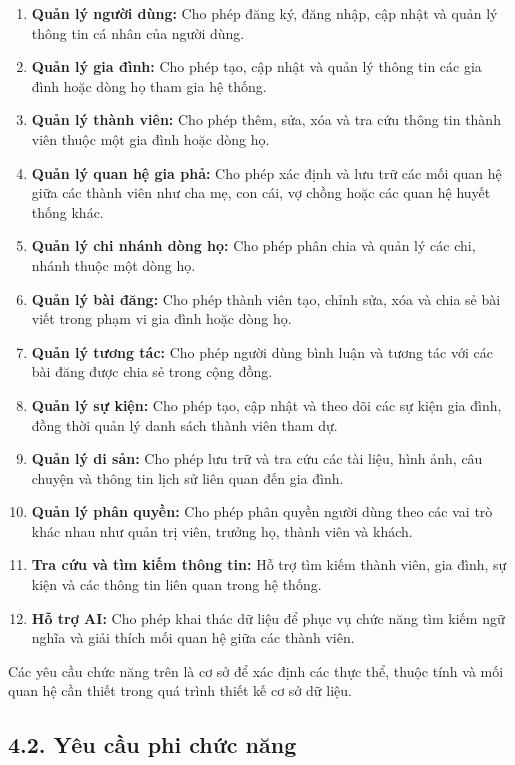 \begin{enumerate}[leftmargin=*]
\item \textbf{Quản lý người dùng:} Cho phép đăng ký, đăng nhập, cập nhật và quản lý thông tin cá nhân của người dùng.
\item \textbf{Quản lý gia đình:} Cho phép tạo, cập nhật và quản lý thông tin các gia đình hoặc dòng họ tham gia hệ thống.
\item \textbf{Quản lý thành viên:} Cho phép thêm, sửa, xóa và tra cứu thông tin thành viên thuộc một gia đình hoặc dòng họ.
\item \textbf{Quản lý quan hệ gia phả:} Cho phép xác định và lưu trữ các mối quan hệ giữa các thành viên như cha mẹ, con cái, vợ chồng hoặc các quan hệ huyết thống khác.
\item \textbf{Quản lý chi nhánh dòng họ:} Cho phép phân chia và quản lý các chi, nhánh thuộc một dòng họ.
\item \textbf{Quản lý bài đăng:} Cho phép thành viên tạo, chỉnh sửa, xóa và chia sẻ bài viết trong phạm vi gia đình hoặc dòng họ.
\item \textbf{Quản lý tương tác:} Cho phép người dùng bình luận và tương tác với các bài đăng được chia sẻ trong cộng đồng.
\item \textbf{Quản lý sự kiện:} Cho phép tạo, cập nhật và theo dõi các sự kiện gia đình, đồng thời quản lý danh sách thành viên tham dự.
\item \textbf{Quản lý di sản:} Cho phép lưu trữ và tra cứu các tài liệu, hình ảnh, câu chuyện và thông tin lịch sử liên quan đến gia đình.
\item \textbf{Quản lý phân quyền:} Cho phép phân quyền người dùng theo các vai trò khác nhau như quản trị viên, trưởng họ, thành viên và khách.
\item \textbf{Tra cứu và tìm kiếm thông tin:} Hỗ trợ tìm kiếm thành viên, gia đình, sự kiện và các thông tin liên quan trong hệ thống.
\item \textbf{Hỗ trợ AI:} Cho phép khai thác dữ liệu để phục vụ chức năng tìm kiếm ngữ nghĩa và giải thích mối quan hệ giữa các thành viên.
\end{enumerate}

Các yêu cầu chức năng trên là cơ sở để xác định các thực thể, thuộc tính và mối quan hệ cần thiết trong quá trình thiết kế cơ sở dữ liệu.

\subsection*{4.2. Yêu cầu phi chức năng}
{}

